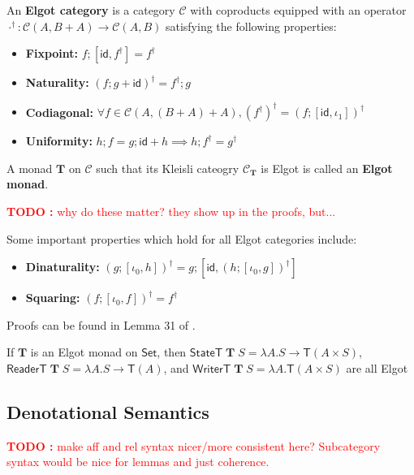 \documentclass[acmsmall,screen,review]{acmart}
\newcounter{todos}
\newcommand{\TODO}[1]{{
  \stepcounter{todos}
  \begin{center}\large{\textcolor{red}{\textbf{TODO \arabic{todos}:} #1}}\end{center}
}}
\newcommand{\mc}[1]{\ensuremath{\mathcal{#1}}}
\newcommand{\mb}[1]{\ensuremath{\mathbf{#1}}}
\newcommand{\ms}[1]{\ensuremath{\mathsf{#1}}}
\begin{document}
\begin{definition} 
  An \textbf{Elgot category} is a category \(\mc{C}\) with coproducts equipped
  with an operator \(\cdot^\dagger: \mc{C}(A, B + A) \to \mc{C}(A, B)\)
  satisfying the following properties:
  \begin{itemize}
    \item \textbf{Fixpoint:} \(f;[\ms{id}, f^\dagger] = f^\dagger\)
    \item \textbf{Naturality:} \((f;g + \ms{id})^\dagger = f^\dagger;g\)
    \item \textbf{Codiagonal:} \(\forall f \in \mc{C}(A, (B + A) + A), (f^\dagger)^\dagger = (f;[\ms{id}, \iota_1])^\dagger\)
    \item \textbf{Uniformity:}
    \(
      h;f = g;\ms{id} + h \implies h;f^\dagger = g^\dagger
    \)
  \end{itemize}
  A monad \(\mb{T}\) on \(\mc{C}\) such that its Kleisli cateogry
  \(\mc{C}_{\mb{T}}\) is Elgot is called an \textbf{Elgot monad}.
\end{definition}
\TODO{why do these matter? they show up in the proofs, but...}
Some important properties which hold for all Elgot categories include:
\begin{itemize}
  \item \textbf{Dinaturality:} \((g;[\iota_0, h])^\dagger = g;[\ms{id},
  (h;[\iota_0, g])^\dagger]\)
  \item \textbf{Squaring:} \((f;[\iota_0, f])^\dagger = f^\dagger\)
\end{itemize}
Proofs can be found in Lemma 31 of \cite{goncharov-squaring}.

\begin{proposition}
  If \(\mb{T}\) is an Elgot monad on \(\ms{Set}\), then \(\ms{StateT}\;\mb{T}\;S
  = \lambda A. S \to \ms{T}(A \times S)\), \(\ms{ReaderT}\;\mb{T}\;S = \lambda
  A. S \to \ms{T}(A)\), and \(\ms{WriterT}\;\mb{T}\;S = \lambda A. \ms{T}(A
  \times S)\) are all Elgot
\end{proposition}

\subsection{Denotational Semantics}

\TODO{make aff and rel syntax nicer/more consistent here? Subcategory syntax
would be nice for lemmas and just coherence.}
\end{document}
